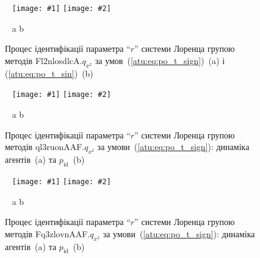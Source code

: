 \documentclass[14pt,handout,utf8]{beamer}
\newcommand{\ABlbl}{%
  \vspace{-2.9ex}
  \begin{center}
    ~ \hfill a \hfill\hfill b \hfill ~
  \end{center}
  \vspace{-2.0ex}
}
\newcommand{\PicDouble}[2]{%
 \begin{center}
    ~ \hfill
    \texttt{[image: \#1]}
    \hfill
    \texttt{[image: \#2]}
    \hfill ~
  \end{center}
  \ABlbl
}
\newcommand{\PicDoubleS}[2]{%
 \begin{center}
    ~ \hfill
    \texttt{[image: \#1]}
    \hfill
    \texttt{[image: \#2]}
    \hfill ~
  \end{center}
  \ABlbl
}
\begin{document}
\begin{frame}
  \frametitle{~}

  \begin{figure}[htb!]
    \PicDoubleS{../p5/p/cha/lor/Fl2nlosdlcA/Fl2nlosdlcA-p_xz_1_wp009.png}{../p5/p/cha/lor/Fl2nlosdlcA/Fl2nlosdlcA-p_xz_0_wp009.png}
    \caption{Процес ідентифікації параметра ``$r$'' системи Лоренца групою методів Fl2nlosdlcA.$q_{x^2} $ за умов~(\ref{atu:eq:po_t_sign})~(a) і (\ref{atu:eq:po_t_sin})~(b)}
    \label{atu:f:lor_id_Fl2nlosdlcA_wp009}
  \end{figure}

  \vspace{-3ex}

  \begin{figure}[htb!]
    \PicDouble{../p5/p/cha/lor/ql3ruonAAF/lor_ql3ruonAAF_qy2-p_t_pi_sign.png}{../p5/p/cha/lor/ql3ruonAAF/lor_ql3ruonAAF_qy2-p_t_pz_sign.png}
    \caption{Процес ідентифікації параметра ``$r$'' системи Лоренца групою методів ql3ruonAAF.$q_{x^2} $ за умови~(\ref{atu:eq:po_t_sign}): динаміка агентів~(a) та $p_\mathrm{id}$~(b)}
    \label{atu:f:lor_id_ql3ruonAAF.q_x2_sign}
  \end{figure}

  \vspace{-3ex}

  \begin{figure}[htb!]
    \PicDouble{../p5/p/cha/lor/Fq3zlovnAAF/lor_Fq3zlovnAAF_qx2-pl_n_sign.png}{../p5/p/cha/lor/Fq3zlovnAAF/lor_Fq3zlovnAAF_qx2-p_p_sign.png}
    \caption{Процес ідентифікації параметра ``$r$'' системи Лоренца групою методів Fq3zlovnAAF.$q_{x^2} $ за умови~(\ref{atu:eq:po_t_sign}): динаміка агентів~(a) та $p_\mathrm{id}$~(b)}
    \label{atu:f:lor_id_Fq3zlovnAAF.q_x2_sign}
  \end{figure}


\end{frame}


\end{document}
